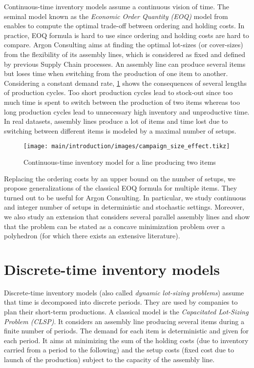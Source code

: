 Continuous-time inventory models assume a continuous vision of time.
The seminal model known as the \emph{Economic Order Quantity (EOQ)} model from \citet{Harris1913} enables to compute the optimal trade-off between ordering and holding costs.
In practice, EOQ formula is hard to use since ordering and holding costs are hard to compare.
Argon Consulting aims at finding the optimal lot-sizes (or cover-sizes) from the flexibility of its assembly lines, which is considered as fixed and defined by previous Supply Chain processes.
An assembly line can produce several items but loses time when switching from the production of one item to another.
Considering a constant demand rate, \cref{fig:intro:en:continuous-time-inventory-model} shows the consequences of several lengths of production cycles.
Too short production cycles lead to stock-out since too much time is spent to switch between the production of two items whereas too long production cycles lead to unnecessary high inventory and unproductive time.
In real datasets, assembly lines produce a lot of items and time lost due to switching between different items is modeled by a maximal number of setups.


\begin{figure}[!ht]
  \centering
  \texttt{[image: main/introduction/images/campaign\_size\_effect.tikz]}
  \caption{Continuous-time inventory model for a line producing two items}
  \label{fig:intro:en:continuous-time-inventory-model}
\end{figure}


\medskip


Replacing the ordering costs by an upper bound on the number of setups, we propose generalizations of the classical EOQ formula for multiple items.
They turned out to be useful for Argon Consulting.
In particular, we study continuous and integer number of setups in deterministic and stochastic settings.
Moreover, we also study an extension that considers several parallel assembly lines and show that the problem can be stated as a concave minimization problem over a polyhedron (for which there exists an extensive literature).


\section{Discrete-time inventory models}
\label{sec:intro:en:discrete-time-inventory-models}


Discrete-time inventory models (also called \emph{dynamic lot-sizing problems}) assume that time is decomposed into discrete periods.
They are used by companies to plan their short-term productions.
A classical model is the \emph{Capacitated Lot-Sizing Problem (CLSP)}.
It considers an assembly line producing several items during a finite number of periods.
The demand for each item is deterministic and given for each period.
It aims at minimizing the sum of the holding costs (due to inventory carried from a period to the following) and the setup costs (fixed cost due to launch of the production) subject to the capacity of the assembly line.


